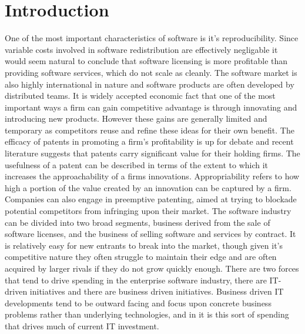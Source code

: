 \section*{Introduction}

One of the most important characteristics of software is it's reproducibility.\autocite[3]{buxmann2012software}
Since variable costs involved in software redistribution are effectively negligable it would seem natural to conclude that software licensing is more profitable than providing software services, which do not scale as cleanly.\autocite[3]{buxmann2012software}
The software market is also highly international in nature and software products are often developed by distributed teams.\autocite[3]{buxmann2012software}
It is widely accepted economic fact that one of the most important ways a firm can gain competitive advantage is through innovating and introducing new products. However these gains are generally limited and temporary as competitors reuse and refine these ideas for their own benefit.\autocite[81]{ceccagnoli2007appropriability}
The efficacy of patents in promoting a firm's profitability is up for debate and recent literature suggests that patents carry significant value for their holding firms.\autocite[]{ceccagnoli2007appropriability}
The usefulness of a patent can be described in terms of the extent to which it increases the approachability of a firms innovations.\autocite[81]{ceccagnoli2007appropriability}
Appropriability refers to how high a portion of the value created by an innovation can be captured by a firm.\autocite[82]{ceccagnoli2007appropriability}
Companies can also engage in preemptive patenting, aimed at trying to blockade potential competitors from infringing upon their market.\autocite[83]{ceccagnoli2007appropriability}
The software industry can be divided into two broad segments, business derived from the sale of software licenses, and the business of selling software and services by contract.\autocite[]{ValuelineOverview}
It is relatively easy for new entrants to break into the market, though given it's competitive nature they often struggle to maintain their edge and are often acquired by larger rivals if they do not grow quickly enough.\autocite[]{ValuelineOverview}
There are two forces that tend to drive spending in the enterprise software industry, there are IT-driven initiatives and there are business driven initiatives.\autocite[]{NextGenBusinessSoftware}
Business driven IT developments tend to be outward facing and focus upon concrete business problems rather than underlying technologies, and in it is this sort of spending that drives much of current IT investment.\autocite[]{NextGenBusinessSoftware}
